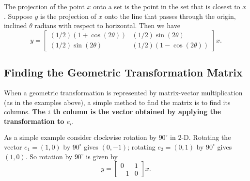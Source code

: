 \begin{definition}
    The projection of the point $ x $ onto a set is the point in the set that is closest to $ x $. Suppose $ y $ is the projection of $ x $ onto the line that passes through the origin, inclined $ \theta $ radians with respect to horizontal. Then we have
$$
y=\left[\begin{array}{cc}
(1 / 2)(1+\cos (2 \theta)) & (1 / 2) \sin (2 \theta) \\
(1 / 2) \sin (2 \theta) & (1 / 2)(1-\cos (2 \theta))
\end{array}\right] x .
$$
\end{definition}


\subsection{Finding the Geometric Transformation Matrix}

When a geometric transformation is represented by matrix-vector multiplication (as in the examples above), a simple method to find the matrix is to find its columns. \textbf{The $ i $ th column is the vector obtained by applying the transformation to $ e_{i} . $}

\begin{example}
    As a simple example consider clockwise rotation by $ 90^{\circ} $ in 2-D. Rotating the vector $ e_{1}=(1,0) $ by $ 90^{\circ} $ gives $ (0,-1) $; rotating $ e_{2}=(0,1) $ by $ 90^{\circ} $ gives $ (1,0) $. So rotation by $ 90^{\circ} $ is given by
$$
y=\left[\begin{array}{rr}
0 & 1 \\
-1 & 0
\end{array}\right] x .
$$
\end{example}

